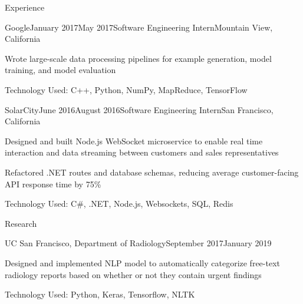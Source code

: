 \documentclass{resume} %
\begin{document}
\begin{rSection}{Experience}
\begin{rSubsection}{Google}{January 2017\textminus May 2017}{Software Engineering Intern}{Mountain View, California}
\item[] Wrote large-scale data processing pipelines for example generation, model training, and model evaluation
\item[] Technology Used: C++, Python, NumPy, MapReduce, TensorFlow
\end{rSubsection}
\begin{rSubsection}{SolarCity}{June 2016\textminus August 2016}{Software Engineering Intern}{San Francisco, California}
\item[] Designed and built Node.js WebSocket microservice to enable real time interaction and data streaming between customers and sales representatives
\item[] Refactored .NET routes and database schemas, reducing average customer-facing API response time by 75\%
\item[] Technology Used: C\#, .NET, Node.js, Websockets, SQL, Redis
\end{rSubsection}
\end{rSection}

\begin{rSection}{Research}
\begin{rSubsection}{UC San Francisco, Department of Radiology}{September 2017\textminus January 2019}{}{}
\item[] Designed and implemented NLP model to automatically categorize free-text radiology reports based on whether or not they contain urgent findings
\item[] Technology Used: Python, Keras, Tensorflow, NLTK
\end{rSubsection}
\end{rSection}






\end{document}
